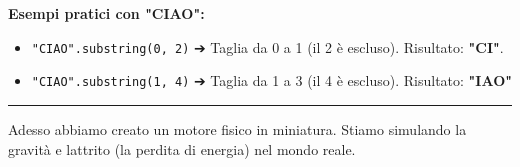 \documentclass[
]{article}
\begin{document}
\textbf{Esempi pratici con "CIAO":}

\begin{itemize}
\item
  \texttt{"CIAO".substring(0,\ 2)} ➔ Taglia da 0 a 1 (il 2 è escluso).
  Risultato: \textbf{"CI"}.
\item
  \texttt{"CIAO".substring(1,\ 4)} ➔ Taglia da 1 a 3 (il 4 è escluso).
  Risultato: \textbf{"IAO"}
\end{itemize}

\begin{center}\rule{0.5\linewidth}{0.5pt}\end{center}

Adesso abbiamo creato un motore fisico in miniatura. Stiamo simulando la
gravità e l\textquotesingle attrito (la perdita di energia) nel mondo
reale.
\end{document}
